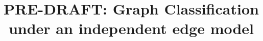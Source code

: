  
\usepackage{url}


% 

\usepackage{array}
\usepackage{mdwmath}
\usepackage{mdwtab}

\usepackage{url}
\usepackage{amsfonts}
\usepackage{subfigure}

\usepackage{algorithm}
\renewcommand{\algorithmicrequire}{\textbf{Input:}}
\renewcommand{\algorithmicensure}{\textbf{Output:}}


% 
% 
% 
% 
\newcommand{\hth}{\mh{\bth}}
\newcommand{\pp}{p}
\newcommand{\qq}{q}




\title{PRE-DRAFT: Graph Classification under an independent edge model}


